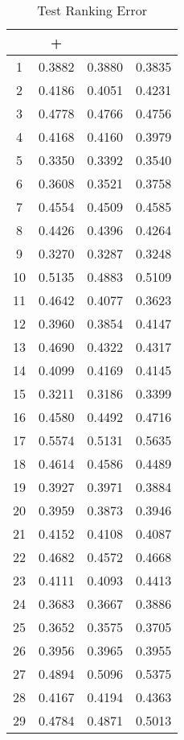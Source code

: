 \begin{table}[ht]\footnotesize
\centering
\caption{Test Ranking Error}
\label{Table:mil_test_error}
\begin{tabular}{|c|c|c|c|}
  \hline
          &\RB{}+  &  \CRB{}  &  \RB{}\\ 
  \hline
1  &  0.3882   &  0.3880   &  0.3835 \\ 
2  &  0.4186   &  0.4051   &  0.4231 \\ 
3  &  0.4778   &  0.4766   &  0.4756 \\ 
4  &  0.4168   &  0.4160   &  0.3979 \\ 
5  &  0.3350   &  0.3392   &  0.3540 \\ 
6  &  0.3608   &  0.3521   &  0.3758 \\ 
7  &  0.4554   &  0.4509   &  0.4585 \\ 
8  &  0.4426   &  0.4396   &  0.4264 \\ 
9  &  0.3270   &  0.3287   &  0.3248 \\ 
10  &  0.5135   &  0.4883   &  0.5109 \\ 
11  &  0.4642   &  0.4077   &  0.3623 \\ 
12  &  0.3960   &  0.3854   &  0.4147 \\ 
13  &  0.4690   &  0.4322   &  0.4317 \\ 
14  &  0.4099   &  0.4169   &  0.4145 \\ 
15  &  0.3211   &  0.3186   &  0.3399 \\ 
16  &  0.4580   &  0.4492   &  0.4716 \\ 
17  &  0.5574   &  0.5131   &  0.5635 \\ 
18  &  0.4614   &  0.4586   &  0.4489 \\ 
19  &  0.3927   &  0.3971   &  0.3884 \\ 
20  &  0.3959   &  0.3873   &  0.3946 \\ 
21  &  0.4152   &  0.4108   &  0.4087 \\ 
22  &  0.4682   &  0.4572   &  0.4668 \\ 
23  &  0.4111   &  0.4093   &  0.4413 \\ 
24  &  0.3683   &  0.3667   &  0.3886 \\ 
25  &  0.3652   &  0.3575   &  0.3705 \\ 
26  &  0.3956   &  0.3965   &  0.3955 \\ 
27  &  0.4894   &  0.5096   &  0.5375 \\ 
28  &  0.4167   &  0.4194   &  0.4363 \\ 
29  &  0.4784   &  0.4871   &  0.5013 \\ 

\end{tabular}
\end{table}
